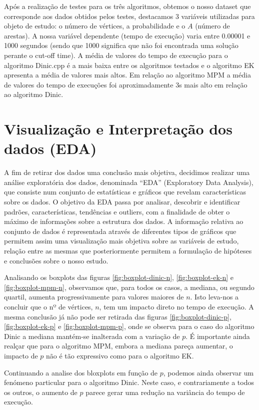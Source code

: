 \documentclass{uofa-eng-assignment}
\begin{document}
Após a realização de testes para os três algoritmos, obtemos o nosso dataset que corresponde aos dados obtidos pelos testes, destacamos  3 variáveis utilizadas para objeto de estudo: o número de vértices, a probabilidade e o $A$ (número de arestas). A nossa variável dependente (tempo de execução) varia entre 0.00001 e 1000 segundos (sendo que 1000 significa que não foi encontrada uma solução perante o cut-off time).
A média de valores do tempo de execução para o algoritmo Dinic.cpp é a mais baixa entre os algoritmos testados e o algoritmo EK apresenta a média de valores mais altos.
Em relação ao algoritmo MPM a média de valores do tempo de execuções foi aproximadamente 3s mais alto em relação ao algoritmo Dinic.

\section{Visualização e Interpretação dos dados (EDA) }

A fim de retirar dos dados uma conclusão mais objetiva, decidimos realizar uma análise exploratória dos dados, denominada “EDA” (Exploratory Data Analysis), que consiste num conjunto de estatísticas e gráficos que revelam características sobre os dados. O objetivo da EDA passa por analisar, descobrir e identificar padrões, características, tendências e outliers, com a finalidade de obter o máximo de informações sobre a estrutura dos dados.
A informação relativa ao conjunto de dados é representada através de diferentes tipos de gráficos que permitem assim uma visualização  mais objetiva sobre as variáveis de estudo, relação entre as mesmas que posteriormente permitem a formulação de hipóteses e conclusões sobre o nosso estudo.

Analisando os boxplots das figuras \ref{fig:boxplot-dinic-n}, \ref{fig:boxplot-ek-n} e \ref{fig:boxplot-mpm-n}, observamos que, para todos os casos, a mediana, ou segundo quartil, aumenta progressivamente para valores maiores de $n$. Isto leva-nos a concluir que o nº de vértices, $n$, tem um impacto direto no tempo de execução. A mesma conclusão já não pode ser retirada das figuras \ref{fig:boxplot-dinic-p}, \ref{fig:boxplot-ek-p} e \ref{fig:boxplot-mpm-p}, onde se observa para o caso do algoritmo Dinic a mediana mantém-se inalterada com a variação de $p$. É importante ainda realçar que para o algoritmo MPM, embora a mediana pareça aumentar, o impacto de $p$ não é tão expressivo como para o algoritmo EK.

Continuando a analise dos bloxplots em função de $p$, podemos ainda observar um fenómeno particular para o algoritmo Dinic. Neste caso, e contrariamente a todos os outros, o aumento de $p$ parece gerar uma redução na variância do tempo de execução.
\end{document}
